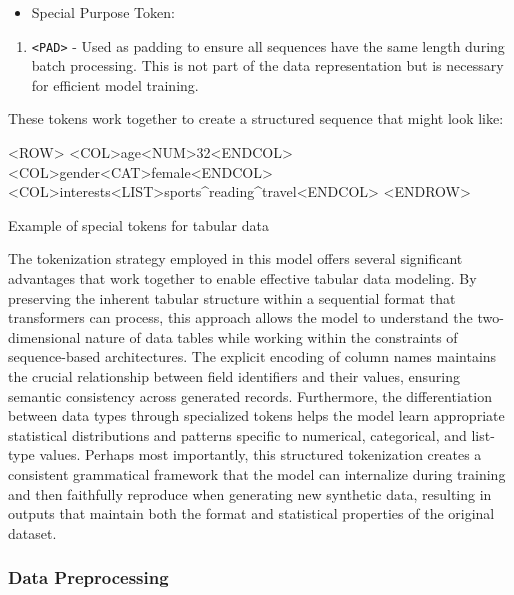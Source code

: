 \documentclass{article}
\begin{document}
\begin{itemize}
\item Special Purpose Token:
\end{itemize}
\begin{enumerate}
        \item \texttt{<PAD>} - Used as padding to ensure all sequences have the same length during batch processing. This is not part of the data representation but is necessary for efficient model training.
\end{enumerate}

These tokens work together to create a structured sequence that might look like:

\begin{table}[!ht]
\centering
\renewcommand{\arraystretch}{1.3}
\begin{Code}
                        <ROW>
                        <COL>age<NUM>32<ENDCOL>
                        <COL>gender<CAT>female<ENDCOL>
                        <COL>interests<LIST>sports^reading^travel<ENDCOL>
                        <ENDROW>
\end{Code}
\caption{Example of special tokens for tabular data}
\label{tab:special_tokens}
\end{table}

The tokenization strategy employed in this model offers several significant advantages that work together to enable effective tabular data modeling. By preserving the inherent tabular structure within a sequential format that transformers can process, this approach allows the model to understand the two-dimensional nature of data tables while working within the constraints of sequence-based architectures. The explicit encoding of column names maintains the crucial relationship between field identifiers and their values, ensuring semantic consistency across generated records. Furthermore, the differentiation between data types through specialized tokens helps the model learn appropriate statistical distributions and patterns specific to numerical, categorical, and list-type values. Perhaps most importantly, this structured tokenization creates a consistent grammatical framework that the model can internalize during training and then faithfully reproduce when generating new synthetic data, resulting in outputs that maintain both the format and statistical properties of the original dataset.


\subsubsection[short]{Data Preprocessing}
\end{document}
